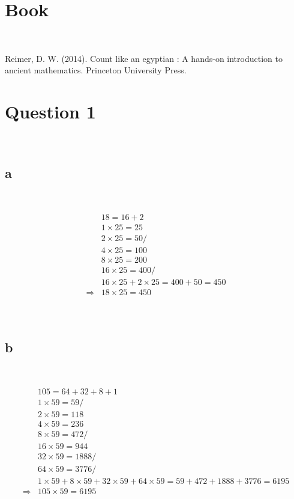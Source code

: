 \documentclass{article}
\begin{document}
\section*{Book}

~

Reimer, D. W. (2014). Count like an egyptian : A hands-on introduction to ancient mathematics. Princeton University Press.

\newpage

\section*{Question 1}

~

\subsection*{a}

~

\begin{align*}
    &18=16+2\\
    &1\times25=25\\
    &2\times25=50/\\
    &4\times25=100\\
    &8\times25=200\\
    &16\times25=400/\\
    &16\times25+2\times25=400+50=450\\
    \Rightarrow&18\times25=450\\
\end{align*}

~

\subsection*{b}

~

\begin{align*}
    &105=64+32+8+1\\
    &1\times59=59/\\
    &2\times59=118\\
    &4\times59=236\\
    &8\times59=472/\\
    &16\times59=944\\
    &32\times59=1888/\\
    &64\times59=3776/\\
    &1\times59+8\times59+32\times59+64\times59=59+472+1888+3776=6195\\
    \Rightarrow&105\times59=6195\\
\end{align*}
\end{document}

